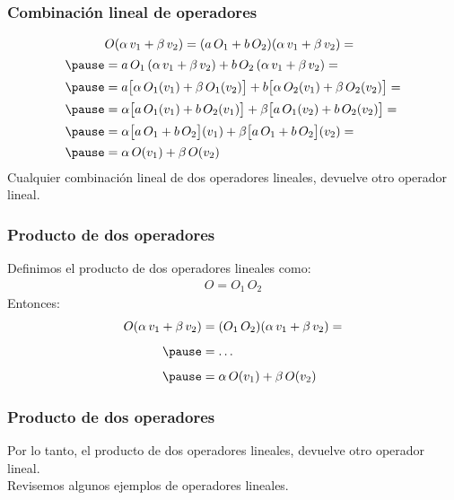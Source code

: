 \documentclass[12pt]{beamer}
\begin{document}
\begin{frame}
\frametitle{Combinación lineal de operadores}
\vspace*{-1cm}
\begin{eqnarray*}
\begin{aligned}
&O(\alpha \, v_{1} + \beta \, v_{2}) = (a \, O_{1} + b \, O_{2})(\alpha \, v_{1} + \beta \, v_{2}) = \\[0.15em] \pause
&= a \, O_{1} \, (\alpha \, v_{1} + \beta \, v_{2}) + b \, O_{2} \, (\alpha \, v_{1} + \beta \, v_{2}) = \\[0.15em] \pause
&= a \big[ \alpha \, O_{1} (v_{1}) + \beta \, O_{1}(v_{2})  \big] + b \big[ \alpha \, O_{2} (v_{1}) + \beta \, O_{2}(v_{2}) \big] = \\[0.15em] \pause
&= \alpha \big[ a \, O_{1}(v_{1}) + b \, O_{2}(v_{1}) \big] + \beta \big[ a \, O_{1}(v_{2}) + b \, O_{2}(v_{2}) \big] = \\[0.15em] \pause
&= \alpha \big[ a \, O_{1} + b \, O_{2} \big] (v_{1}) + \beta \big[ a \, O_{1} + b \, O_{2} \big] (v_{2}) = \\[0.15em] \pause
&= \alpha \, O(v_{1}) + \beta \, O(v_{2})
\end{aligned}
\end{eqnarray*}
Cualquier combinación lineal de dos operadores lineales, devuelve otro operador lineal.
\end{frame}
\begin{frame}
\frametitle{Producto de dos operadores}
Definimos el producto de dos operadores lineales como:
\pause
\begin{align*}
O = O_{1} \, O_{2}
\end{align*}
\pause
Entonces:
\pause
\begin{eqnarray*}
\begin{aligned}
O(\alpha \, v_{1} + \beta \, v_{2}) &= (O_{1} \, O_{2})(\alpha \, v_{1} + \beta \, v_{2}) = \\[0.5em] \pause
&= \ldots \\[0.5em] \pause
&= \alpha \, O(v_{1}) + \beta \, O(v_{2})
\end{aligned}
\end{eqnarray*}
\end{frame}
\begin{frame}
\frametitle{Producto de dos operadores}
Por lo tanto, el producto de dos operadores lineales, devuelve otro operador lineal.
\\
\bigskip
\pause
Revisemos algunos ejemplos de operadores lineales.
\end{frame}
\end{document}
